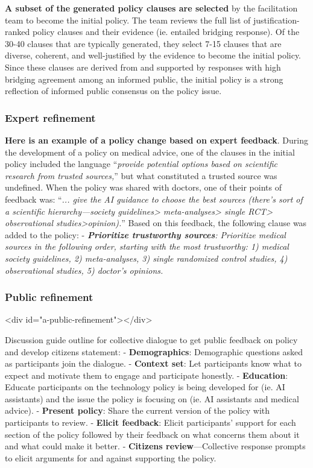 \documentclass{article}
\begin{document}
\textbf{A subset of the generated policy clauses are selected} by the facilitation team to become the initial policy. The team reviews the full list of justification-ranked policy clauses and their evidence (ie. entailed bridging response). Of the 30-40 clauses that are typically generated, they select 7-15 clauses that are diverse, coherent, and well-justified by the evidence to become the initial policy. Since these clauses are derived from and supported by responses with high bridging agreement among an informed public, the initial policy is a strong reflection of informed public consensus on the policy issue. 

\subsubsection{Expert refinement}

\textbf{Here is an example of a policy change based on expert feedback}. During the development of a policy on medical advice, one of the clauses in the initial policy included the language “\emph{provide potential options based on scientific research from trusted sources,}” but what constituted a trusted source was undefined. When the policy was shared with doctors, one of their points of feedback was: “\emph{... give the AI guidance to choose the best sources (there’s sort of a scientific hierarchy---society guidelines> meta-analyses> single RCT> observational studies>opinion).}” Based on this feedback, the following clause was added to the policy:
-  \emph{\textbf{Prioritize trustworthy sources}: Prioritize medical sources in the following order, starting with the most trustworthy: 1) medical society guidelines, 2) meta-analyses, 3) single randomized control studies, 4) observational studies, 5) doctor's opinions.}

\subsubsection{Public refinement}<div id="a-public-refinement"></div>

Discussion guide outline for collective dialogue to get public feedback on policy and develop citizens statement:
-  \textbf{Demographics}: Demographic questions asked as participants join the dialogue.
-  \textbf{Context set}: Let participants know what to expect and motivate them to engage and participate honestly.
-  \textbf{Education}: Educate participants on the technology policy is being developed for (ie. AI assistants) and the issue the policy is focusing on (ie. AI assistants and medical advice).
-  \textbf{Present policy}: Share the current version of the policy with participants to review.
-  \textbf{Elicit feedback}: Elicit participants' support for each section of the policy followed by their feedback on what concerns them about it and what could make it better.
-  \textbf{Citizens review}---Collective response prompts to elicit arguments for and against supporting the policy.
\end{document}
